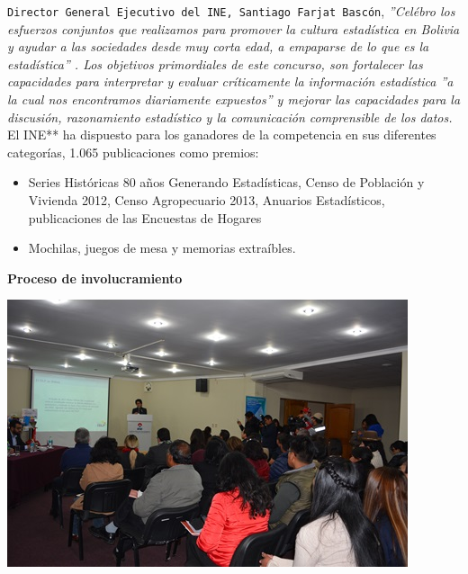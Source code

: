\documentclass[8pt,a4paper]{article} %
\newcommand{\NewsItem}[1]{ %
\usefont{T1}{fvs}{n}{n} %
\vspace{24pt}\large #1\vspace{3pt} %
\par \normalsize \normalfont}
\begin{document}
\begin{multicols}{2}
\vspace{0.2cm}

{\tt Director General Ejecutivo del INE, Santiago Farjat Bascón}, \textit{''Celébro los esfuerzos conjuntos que realizamos para promover la cultura estadística en Bolivia y ayudar a las sociedades desde muy corta edad, a empaparse de lo que es la estadística'' . Los objetivos primordiales de este 
concurso, son fortalecer las capacidades para interpretar y evaluar críticamente la información estadística ''a la 
cual nos encontramos diariamente expuestos'' y mejorar las capacidades para la discusión, razonamiento estadístico y 
la comunicación comprensible de los datos.}\\

El INE** ha dispuesto para los ganadores de la competencia en sus diferentes categorías, 1.065
 publicaciones como premios: 

\begin{multicols}{2}
\begin{small}
\begin{itemize}
\item Series Históricas 80 años Generando Estadísticas, Censo de Población y Vivienda 2012, Censo Agropecuario 2013, Anuarios Estadísticos, publicaciones de las Encuestas de Hogares
\item Mochilas, juegos de mesa y memorias extraíbles.
\end{itemize}
\end{small}
\end{multicols}

\NewsItem{\textbf{Proceso de involucramiento}}

\begin{center}
\includegraphics[scale=0.6]{foto4.jpg} %
\end{center}


\end{multicols}
\end{document}
